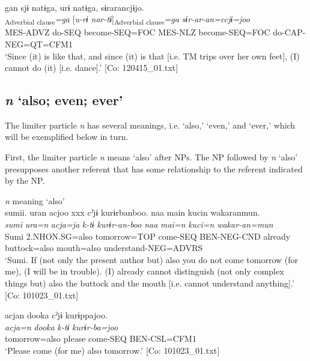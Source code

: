   \ex{}\\
      \glll    gan  sjɨ  natɨga,  urɨ  natɨga,  sɨrarancjɨjo.\\
      [\textit{ga-n}  \textit{sɨr-tɨ}  \textit{nar-tɨ}]\textsubscript{Adverbial clause}\textit{=ga}  [\textit{u-rɨ}   \textit{nar-tɨ}]\textsubscript{Adverbial clause}\textit{=ga}  \textit{sɨr-ar-an=ccjɨ=joo}\\
      MES-ADVZ  do-SEQ  become-SEQ=FOC  MES-NLZ  become-SEQ=FOC  do-CAP-NEG=QT=CFM1\\
      \glt       ‘Since (it) is like that, and since (it) is that [i.e. TM trips over her own feet], (I) cannot do (it) [i.e. dance].’ [Co: 120415\_01.txt]
    \z
\z

\subsection{\textit{n} ‘also; even; ever’}\label{sec:10.1.3}

The limiter particle \textit{n} has several meanings, i.e. ‘also,’ ‘even,’ and ‘ever,’ which will be exemplified below in turn.

First, the limiter particle \textit{n} means ‘also’ after NPs. The NP followed by \textit{n} ‘also’ presupposes another referent that has some relationship to the referent indicated by the NP.

\ea\label{ex:10.17}   \textit{n} meaning ‘also’\\
  \ea  %
      \glll    sumii.  uran  acjoo  xxx  cˀjɨ  kurɨrbanboo.  naa  main  kucin  wakaranmun.\\
      \textit{sumi}  \textit{ura=n}  \textit{acja=ja}    \textit{k-tɨ}  \textit{kurɨr-an-boo}   \textit{naa}  \textit{mai=n}  \textit{kuci=n}  \textit{wakar-an=mun}\\
      Sumi  2.NHON.SG=also  tomorrow=TOP    come{}-SEQ  BEN-NEG-CND    already  buttock=also  mouth=also  understand-NEG=ADVRS\\
      \glt       ‘Sumi. If (not only the present author but) also you do not come tomorrow (for me), (I will be in trouble). (I) already cannot distinguish (not only complex things but) also the buttock and the mouth [i.e. cannot understand anything].’ [Co: 101023\_01.txt]

  \ex  %
      \glll    acjan  dooka  cˀjɨ  kurɨppajoo.\\
      \textit{acja=n}  \textit{dooka}  \textit{k-tɨ}  \textit{kurɨr-ba=joo}\\
      tomorrow=also  please  come-SEQ  BEN-CSL=CFM1\\
      \glt       ‘Please come (for me) also tomorrow.’ [Co: 101023\_01.txt]
    \z
\z

